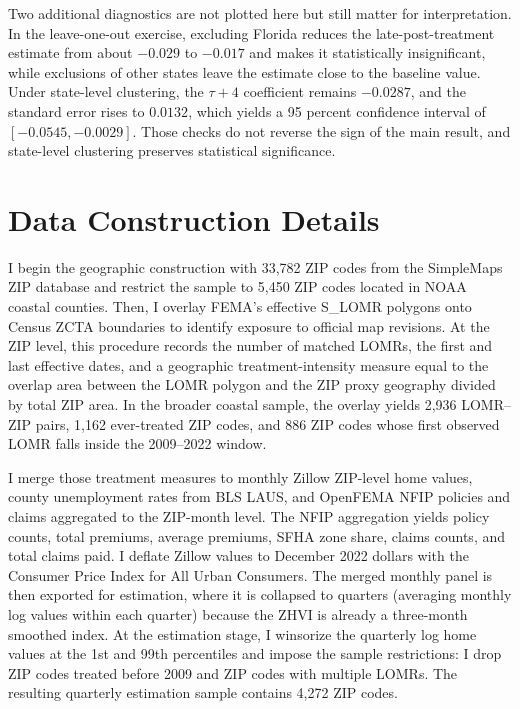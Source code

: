 \documentclass[12pt]{article}
\begin{document}
Two additional diagnostics are not plotted here but still matter for interpretation. In the leave-one-out exercise, excluding Florida reduces the late-post-treatment estimate from about $-0.029$ to $-0.017$ and makes it statistically insignificant, while exclusions of other states leave the estimate close to the baseline value. Under state-level clustering, the $\tau{+}4$ coefficient remains $-0.0287$, and the standard error rises to $0.0132$, which yields a 95 percent confidence interval of $[-0.0545, -0.0029]$. Those checks do not reverse the sign of the main result, and state-level clustering preserves statistical significance.


\section{Data Construction Details}\label{app:data}

I begin the geographic construction with 33,782 ZIP codes from the SimpleMaps ZIP database and restrict the sample to 5,450 ZIP codes located in NOAA coastal counties. Then, I overlay FEMA's effective S\_LOMR polygons onto Census ZCTA boundaries to identify exposure to official map revisions. At the ZIP level, this procedure records the number of matched LOMRs, the first and last effective dates, and a geographic treatment-intensity measure equal to the overlap area between the LOMR polygon and the ZIP proxy geography divided by total ZIP area. In the broader coastal sample, the overlay yields 2,936 LOMR--ZIP pairs, 1,162 ever-treated ZIP codes, and 886 ZIP codes whose first observed LOMR falls inside the 2009--2022 window.

I merge those treatment measures to monthly Zillow ZIP-level home values, county unemployment rates from BLS LAUS, and OpenFEMA NFIP policies and claims aggregated to the ZIP-month level. The NFIP aggregation yields policy counts, total premiums, average premiums, SFHA zone share, claims counts, and total claims paid. I deflate Zillow values to December 2022 dollars with the Consumer Price Index for All Urban Consumers. The merged monthly panel is then exported for estimation, where it is collapsed to quarters (averaging monthly log values within each quarter) because the ZHVI is already a three-month smoothed index. At the estimation stage, I winsorize the quarterly log home values at the 1st and 99th percentiles and impose the sample restrictions: I drop ZIP codes treated before 2009 and ZIP codes with multiple LOMRs. The resulting quarterly estimation sample contains 4,272 ZIP codes.
\end{document}
